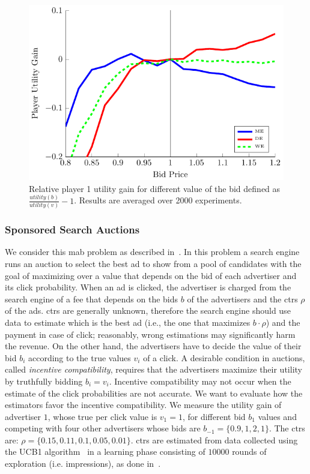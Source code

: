 \begin{figure}[t]
    \begin{minipage}{\columnwidth}
    \centering 
    \includegraphics[scale=0.9]{./img/sponsoredSearch.pdf}
    \caption{Relative player 1 utility gain for different value of the bid defined as $\frac{utility(b)}{utility(v)} - 1$. Results are averaged over 2000 experiments.}\label{F:spSearch}
    \end{minipage}
\end{figure}

\subsubsection{Sponsored Search Auctions}
We consider this \gls{mab} problem as described in~\cite{xu2013mab}. In this problem a search engine runs an auction to select the best ad to show from a pool of candidates with the goal of maximizing over a value that depends on the bid of each advertiser and its click probability. 
When an ad is clicked, the advertiser is charged from the search engine of a fee that depends on the bids $b$ of the advertisers and the \glspl{ctr} $\rho$ of the ads. 
\glspl{ctr} are generally unknown, therefore the search engine should use data to estimate which is the best ad (i.e., the one that maximizes $b\cdot\rho$) and the payment in case of click; reasonably, wrong estimations may significantly harm the revenue.
On the other hand, the advertisers have to decide the value of their bid $b_i$ according to the true values $v_i$ of a click. A desirable condition in auctions, called \textit{incentive compatibility}, requires that the advertisers maximize their utility by truthfully bidding $b_i = v_i$. Incentive compatibility may not occur when the estimate of the click probabilities are not accurate. We want to evaluate how the estimators favor the incentive compatibility.
We measure the utility gain of advertiser $1$, whose true per click value is $v_1 = 1$, for different bid $b_1$ values and competing with four other advertisers whose bids are $b_{-1} = \lbrace 0.9, 1, 2, 1 \rbrace$. The \glspl{ctr} are: $\rho = \lbrace 0.15, 0.11, 0.1, 0.05, 0.01 \rbrace$. 
\glspl{ctr} are estimated from data collected using the UCB1 algorithm~\cite{auer2002finite} in a learning phase consisting of $10000$ rounds of exploration (i.e. impressions), as done in~\cite{xu2013mab}.

